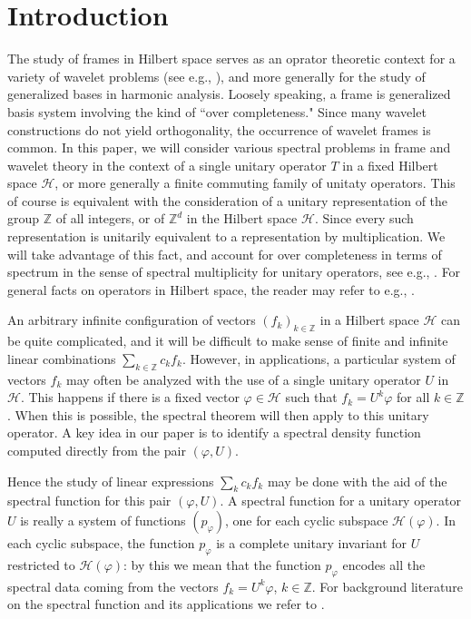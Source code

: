 \documentclass{birkmult}
\theoremstyle{definition}
\theoremstyle{remark}
\numberwithin{equation}{section}
\begin{document}
\maketitle
\tableofcontents

\section{Introduction}
\label{sec:1}

The study of frames in Hilbert space serves as an oprator theoretic 
context for a variety of wavelet problems (see e.g., \cite{Dau92}), and 
more generally for the study of generalized bases in harmonic analysis. 
Loosely speaking, a frame is generalized basis system involving the 
kind of ``over completeness." Since many wavelet constructions do not 
yield orthogonality, the occurrence of wavelet frames is common. In this 
paper, we will consider various spectral problems in frame and wavelet 
theory in the context of a single unitary operator $T$ in a fixed Hilbert 
space $\mathcal{H}$, or more generally a finite commuting family of 
unitaty operators. This of course is equivalent with the consideration of 
a unitary representation of the group $\mathbb{Z}$ of all integers, or of 
$\mathbb{Z}^{d}$ in the Hilbert space $\mathcal{H}$. Since every such 
representation is unitarily equivalent to a representation by 
multiplication. We will take advantage of this fact, and account for over 
completeness in terms of spectrum in the sense of spectral multiplicity 
for unitary operators, see e.g., \cite{Hel64, Hel86}. For general facts on 
operators in Hilbert space, the reader may refer to e.g., \cite{Con90}. 

An arbitrary infinite configuration of vectors $(f_{k})_{k \in \mathbb{Z}}$ 
in a Hilbert space $\mathcal{H}$ can be quite complicated, and it will be 
difficult to make sense of finite and infinite linear combinations 
$\sum_{k \in \mathbb{Z}}c_{k}f_{k}$.  However, in applications, a 
particular system of vectors $f_{k}$ may often be analyzed with the use of 
a single unitary operator $U$ in $\mathcal{H}$.  This happens if there is a 
fixed vector $\varphi \in \mathcal{H}$ such that $f_{k} = U^{k}\varphi$ 
for all $k \in \mathbb{Z}$.  When this is possible, the spectral theorem 
will then apply to this unitary operator.  A key idea in our paper is to 
identify a spectral density function computed directly from the pair 
$(\varphi, U)$.  

Hence the study of linear expressions $\sum_{k}c_{k}f_{k}$ may be done 
with the aid of the spectral function for this pair $(\varphi, U)$.  A 
spectral function for a unitary operator $U$ is really a system of 
functions $(p_{\varphi})$, one for each cyclic subspace 
$\mathcal{H}(\varphi)$.  In each cyclic subspace, the function $p_{\varphi}$ 
is a complete unitary invariant for $U$ restricted to 
$\mathcal{H}(\varphi)$: by this we mean that the function $p_{\varphi}$ 
encodes all the spectral data coming from the vectors $f_{k}=U^{k}\varphi$, 
$k \in \mathbb{Z}$. For background literature on the spectral function and 
its applications we refer to \cite{BH05, JP05, LWW04, PSWX04, Sad06, TT07}. 
\end{document}
